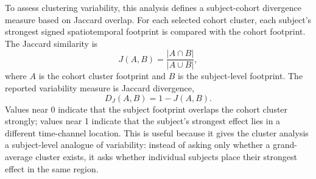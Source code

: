 \documentclass[11pt,a4paper,chapterprefix=false,parskip=false]{scrreprt}
\begin{document}
To assess clustering variability, this analysis defines a subject-cohort divergence measure based on Jaccard overlap. For each selected cohort cluster, each subject's strongest signed spatiotemporal footprint is compared with the cohort footprint. The Jaccard similarity is
\begin{equation}
    J(A,B)=\frac{|A\cap B|}{|A\cup B|},
\end{equation}
where $A$ is the cohort cluster footprint and $B$ is the subject-level footprint. The reported variability measure is Jaccard divergence,
\begin{equation}
    D_J(A,B)=1-J(A,B).
\end{equation}
Values near 0 indicate that the subject footprint overlaps the cohort cluster strongly; values near 1 indicate that the subject's strongest effect lies in a different time-channel location. This is useful because it gives the cluster analysis a subject-level analogue of variability: instead of asking only whether a grand-average cluster exists, it asks whether individual subjects place their strongest effect in the same region.
\end{document}
